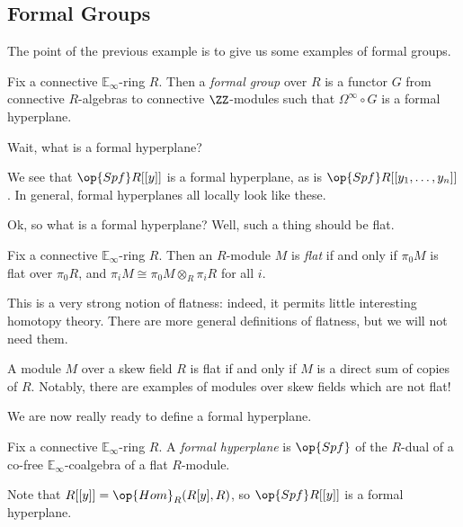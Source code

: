 \documentclass[../notes.tex]{subfiles}
\begin{document}
\subsection{Formal Groups}
The point of the previous example is to give us some examples of formal groups.
\begin{definition}
	Fix a connective $\mathbb E_\infty$-ring $R$. Then a \textit{formal group} over $R$ is a functor $G$ from connective $R$-algebras to connective $\ZZ$-modules such that $\Omega^\infty\circ G$ is a formal hyperplane.
\end{definition}
Wait, what is a formal hyperplane?
\begin{example}
	We see that $\op{Spf}R[[y]]$ is a formal hyperplane, as is $\op{Spf}R[[y_1,\ldots,y_n]]$. In general, formal hyperplanes all locally look like these.
\end{example}
Ok, so what is a formal hyperplane? Well, such a thing should be flat.
\begin{definition}[flat]
	Fix a connective $\mathbb E_\infty$-ring $R$. Then an $R$-module $M$ is \textit{flat} if and only if $\pi_0M$ is flat over $\pi_0R$, and $\pi_iM\cong\pi_0M\otimes_R\pi_iR$ for all $i$.
\end{definition}
\begin{remark}
	This is a very strong notion of flatness: indeed, it permits little interesting homotopy theory. There are more general definitions of flatness, but we will not need them.
\end{remark}
\begin{example}
	A module $M$ over a skew field $R$ is flat if and only if $M$ is a direct sum of copies of $R$. Notably, there are examples of modules over skew fields which are not flat!
\end{example}
We are now really ready to define a formal hyperplane.
\begin{definition}
	Fix a connective $\mathbb E_\infty$-ring $R$. A \textit{formal hyperplane} is $\op{Spf}$ of the $R$-dual of a co-free $\mathbb E_\infty$-coalgebra of a flat $R$-module.
\end{definition}
\begin{example}
	Note that $R[[y]]=\op{Hom}_R(R[y],R)$, so $\op{Spf}R[[y]]$ is a formal hyperplane.
\end{example}
\end{document}
